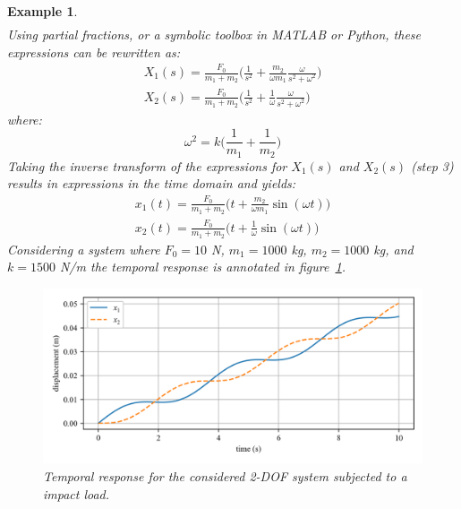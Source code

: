 \documentclass[12pt,letter]{article}
\newtheorem{ex}{Example}
\numberwithin{ex}{section} %
\newenvironment{example}{\begin{mdframed}[middlelinewidth=0.5mm]\begin{ex}\normalfont}{\end{ex}\end{mdframed}}
\numberwithin{re}{section} %
\begin{document}
\begin{example}
\begin{eqnarray}
\end{eqnarray}
Using partial fractions, or a symbolic toolbox in MATLAB or Python, these expressions can be rewritten as:
\begin{eqnarray}
X_1(s) = \frac{F_0}{m_1 + m_2} \bigg( \frac{1}{s^2} + \frac{m_2}{\omega m_1} \frac{\omega}{s^2 + \omega^2} \bigg) \\
X_2(s) = \frac{F_0}{m_1 + m_2} \bigg( \frac{1}{s^2} + \frac{1}{\omega} \frac{\omega}{s^2 + \omega^2} \bigg) \nonumber
\end{eqnarray}
where:
\begin{equation}
\omega^2 = k \bigg( \frac{1}{m_1} + \frac{1}{m_2} \bigg)
\end{equation}
Taking the inverse transform of the expressions for $X_1(s)$ and $X_2(s)$ (step 3) results in expressions in the time domain and yields:
\begin{eqnarray}
x_1(t) = \frac{F_0}{m_1 + m_2} \bigg( t + \frac{m_2}{\omega m_1} \sin (\omega t) \bigg) \\
x_2(t) = \frac{F_0}{m_1 + m_2} \bigg( t + \frac{1}{\omega} \sin (\omega t) \bigg) \nonumber
\end{eqnarray}
Considering a system where $F_0=10$ N, $m_1=1000$ kg, $m_2=1000$ kg, and $k=1500$ N/m the temporal response is annotated in figure~\ref{fig:2_DOF_impact_example}. 


\begin{figure}[H]
	\centering
	\includegraphics[width=\linewidth]{../Figures/2_DOF_impact_example.png}
	\caption{Temporal response for the considered 2-DOF system subjected to a impact load.}
	\label{fig:2_DOF_impact_example}
\end{figure}


\end{example}
\end{document}
